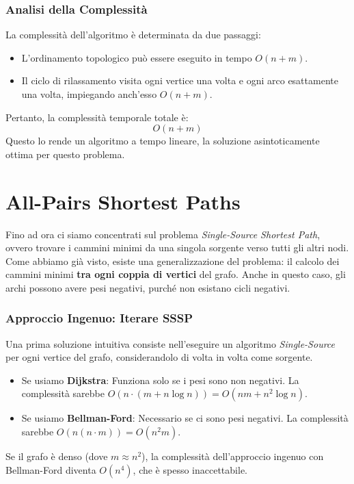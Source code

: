\subsubsection{Analisi della Complessità}
La complessità dell'algoritmo è determinata da due passaggi:
\begin{itemize}
    \item L'ordinamento topologico può essere eseguito in tempo $O(n + m)$.
    \item Il ciclo di rilassamento visita ogni vertice una volta e ogni arco esattamente una volta, impiegando anch'esso $O(n + m)$.
\end{itemize}

\noindent
Pertanto, la complessità temporale totale è:
\[ O(n + m) \]
Questo lo rende un algoritmo a tempo lineare, la soluzione asintoticamente ottima per questo problema.


\clearpage
\section{All-Pairs Shortest Paths}
Fino ad ora ci siamo concentrati sul problema \textit{Single-Source Shortest Path}, ovvero trovare i cammini minimi da una singola sorgente verso tutti gli altri nodi.
Come abbiamo già visto, esiste una generalizzazione del problema: il calcolo dei cammini minimi \textbf{tra ogni coppia di vertici} del grafo.
Anche in questo caso, gli archi possono avere pesi negativi, purché non esistano cicli negativi. 


\subsubsection{Approccio Ingenuo: Iterare SSSP}
Una prima soluzione intuitiva consiste nell'eseguire un algoritmo \textit{Single-Source} per ogni vertice del grafo, considerandolo di volta in volta come sorgente.

\begin{itemize}
    \item Se usiamo \textbf{Dijkstra}: Funziona solo se i pesi sono non negativi. La complessità sarebbe $O(n \cdot (m + n \log n)) = O(nm + n^2 \log n)$.
    \item Se usiamo \textbf{Bellman-Ford}: Necessario se ci sono pesi negativi. La complessità sarebbe $O(n (n \cdot m)) = O(n^2 m)$.
\end{itemize}
Se il grafo è denso (dove $m \approx n^2$), la complessità dell'approccio ingenuo con Bellman-Ford diventa $O(n^4)$, che è spesso inaccettabile.


